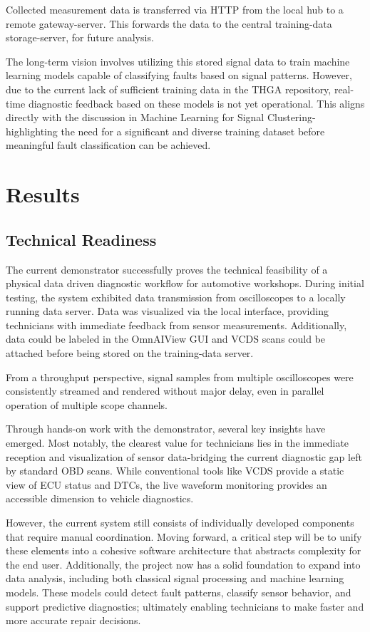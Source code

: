 \documentclass[conference,a4paper]{IEEEtran}
\begin{document}
Collected measurement data is transferred via HTTP from the local hub to a remote gateway-server. 
This forwards the data to the central training-data storage-server, for future analysis. 

The long-term vision involves utilizing this stored signal data to train machine learning models capable of classifying faults based on signal patterns. 
However, due to the current lack of sufficient training data in the THGA repository, real-time diagnostic feedback based on these models is not yet operational. 
This aligns directly with the discussion in Machine Learning for Signal Clustering-highlighting the need for a significant and diverse training dataset before meaningful fault classification can be achieved.




\section{Results}
\subsection{Technical Readiness}
The current demonstrator successfully proves the technical feasibility of a physical data driven diagnostic workflow for automotive workshops. 
During initial testing, the system exhibited data transmission from oscilloscopes to a locally running data server.
Data was visualized via the local interface, providing technicians with immediate feedback from sensor measurements.
Additionally, data could be labeled in the OmnAIView GUI and VCDS scans could be attached before being stored on the training-data server.

From a throughput perspective, signal samples from multiple oscilloscopes were consistently streamed and rendered without major delay, even in parallel operation of multiple scope channels. 

Through hands-on work with the demonstrator, several key insights have emerged. 
Most notably, the clearest value for technicians lies in the immediate reception and visualization of sensor data-bridging the current diagnostic gap left by standard OBD scans. 
While conventional tools like VCDS provide a static view of ECU status and DTCs, the live waveform monitoring provides an accessible dimension to vehicle diagnostics.

However, the current system still consists of individually developed components that require manual coordination. 
Moving forward, a critical step will be to unify these elements into a cohesive software architecture that abstracts complexity for the end user. 
Additionally, the project now has a solid foundation to expand into data analysis, including both classical signal processing and machine learning models. 
These models could detect fault patterns, classify sensor behavior, and support predictive diagnostics; ultimately enabling technicians to make faster and more accurate repair decisions.
\end{document}

